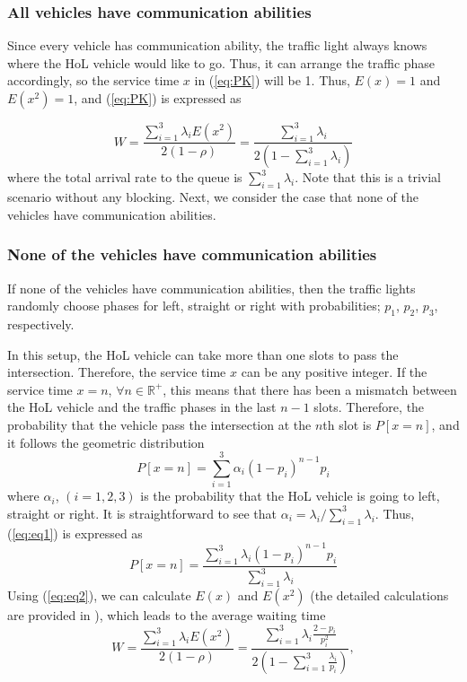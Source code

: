 \documentclass[conference]{IEEEtran}
\begin{document}
\subsubsection{All vehicles have communication abilities}\label{everycartellsmodel1}
Since every vehicle has communication ability, the traffic light always knows where the HoL vehicle would like to go. Thus, it can arrange the traffic phase accordingly, so the service time $x$ in (\ref{eq:PK}) will be 1. Thus, $E(x)=1$ and $E(x^2)=1$, and (\ref{eq:PK}) is expressed as

\begin{equation} \label{waitingtime_servicerate1}
W=\frac{\sum\limits_{i=1}^{3}\lambda_iE(x^2)}{2(1-\rho)}=\frac{\sum\limits_{i=1}^{3}\lambda_i}{2(1-\sum_{i=1}^{3}\lambda_i)}
\end{equation} where the total arrival rate to the queue is $\sum_{i=1}^{3}\lambda_i$. Note that this is a trivial scenario without any blocking. Next, we consider the case that none of the vehicles have communication abilities.

\subsubsection{None of the vehicles have communication abilities}\label{nocarscantellmodel1}
If none of the vehicles have communication abilities, then the traffic lights randomly choose phases for left, straight or right with probabilities; $p_1$, $p_2$, $p_3$, respectively.

In this setup, the HoL vehicle can take more than one slots to pass the intersection. Therefore, the service time $x$ can be any positive integer. If the service time $x=n$, $\forall n\in \mathbb{R^+}$, this means that there has been a mismatch between the HoL vehicle and the traffic phases in the last $n-1$ slots. Therefore, the probability that the vehicle pass the intersection at the $n$th slot is $P[x=n]$, and it follows the geometric distribution
\begin{equation} \label{eq:eq1}
P[x=n]=\sum\limits_{i=1}^{3}\alpha_i (1-p_i)^{n-1}p_i
\end{equation}
where $\alpha_i$, $(i=1,2,3)$ is the probability that the HoL vehicle is going to left, straight or right. It is straightforward to see that $\alpha_i={\lambda_i}/{\sum\limits_{i=1}^{3}\lambda_i}$. Thus, (\ref{eq:eq1}) is expressed as
\begin{equation} \label{eq:eq2}
P[x=n]=\frac{\sum_{i=1}^{3}\lambda_i(1-p_i)^{n-1}p_i}{\sum_{i=1}^{3}\lambda_i}
\end{equation}
Using (\ref{eq:eq2}), we can calculate $E(x)$ and $E(x^2)$ (the detailed calculations are provided in \cite{this_tech}), which leads to the average waiting time
\begin{equation} \label{waitingtime_model1_noonetells}
W=\frac{\sum\limits_{i=1}^{3}\lambda_iE(x^2)}{2(1-\rho)}=\frac{\sum\limits_{i=1}^{3}\lambda_i\frac{2-p_i}{p_i^2}}{2(1-\sum_{i=1}^{3}\frac{\lambda_i}{p_i})},
\end{equation}
\end{document}

